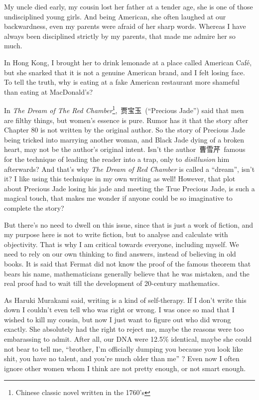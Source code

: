 \documentclass[12pt]{report}
\begin{document}
{
My uncle died early, my cousin lost her father at a tender age, she is one of those undisciplined young girls.  And being American, she often laughed at our backwardness, even my parents were afraid of her sharp words.  Whereas I have always been disciplined strictly by my parents, that made me admire her so much.

In Hong Kong, I brought her to drink lemonade at a place called American Caf\'{e}, but she snarked that it is not a genuine American brand, and I felt losing face.  To tell the truth, why is eating at a fake American restaurant more shameful than eating at MacDonald's?

In \textit{The Dream of The Red Chamber}\footnote{Chinese classic novel written in the 1760's}, \,贾宝玉\, (``Precious Jade'') said that men are filthy things, but women's essence is pure.  Rumor has it that the story after Chapter 80 is not written by the original author.  So the story of Precious Jade being tricked into marrying another woman, and Black Jade dying of a broken heart, may not be the author's original intent.  Isn't the author \,曹雪芹\, famous for the technique of leading the reader into a trap, only to \textit{disillusion} him afterwards?  And that's why \textit{The Dream of Red Chamber} is called a ``dream'', isn't it?  I like using this technique in my own writing as well!  However, that plot about Precious Jade losing his jade and meeting the True Precious Jade, is such a magical touch, that makes me wonder if anyone could be so imaginative to complete the story?

But there's no need to dwell on this issue, since that is just a work of fiction, and my purpose here is not to write fiction, but to analyse and calculate with objectivity.  That is why I am critical towards everyone, including myself.  We need to rely on our own thinking to find answers, instead of believing in old books.  It is said that Fermat did not know the proof of the famous theorem that bears his name, mathematicians generally believe that he was mistaken, and the real proof had to wait till the development of 20-century mathematics.

As Haruki Murakami said, writing is a kind of self-therapy.  If I don't write this down I couldn't even tell who was right or wrong.  I was once so mad that I wished to kill my cousin, but now I just want to figure out who did wrong exactly.  She absolutely had the right to reject me, maybe the reasons were too embarassing to admit.  After all, our DNA were 12.5\% identical, maybe she could not bear to tell me, ``brother, I'm officially dumping you because you look like shit, you have no talent, and you're much older than me'' ?  Even now I often ignore other women whom I think are not pretty enough, or not smart enough.

}
\end{document}
